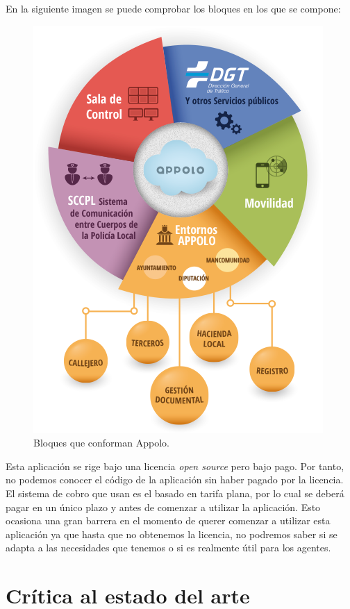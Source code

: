 En la siguiente imagen se puede comprobar los bloques en los que se compone:

\begin{figure}[H]
	\centering
	\includegraphics[scale=0.55]{imagenes/appolo-info.png}
	\caption{Bloques que conforman Appolo. \label{fig:figura15}}
\end{figure}

Esta aplicación se rige bajo una licencia \textit{open source} pero bajo pago. Por tanto, no podemos conocer el código de la aplicación
sin haber pagado por la licencia. El sistema de cobro que usan es el basado en tarifa plana, por lo cual se deberá pagar en un
único plazo y antes de comenzar a utilizar la aplicación. Esto ocasiona una gran barrera en el momento de querer comenzar a utilizar esta aplicación ya que hasta que no obtenemos la licencia, no podremos saber si se adapta a las necesidades que tenemos o si es realmente útil para los agentes.

\section{Crítica al estado del arte}

